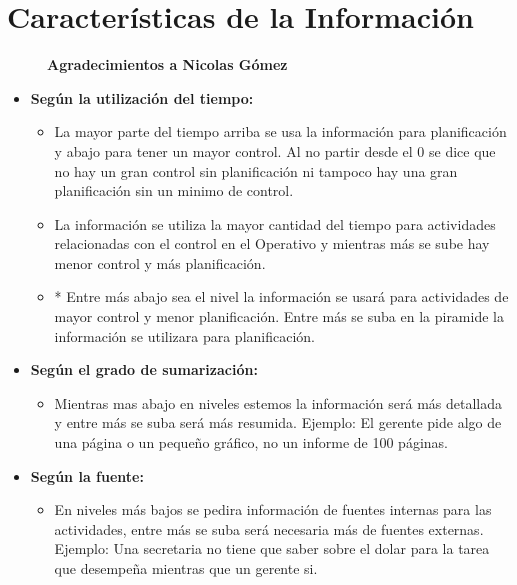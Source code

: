 \documentclass{templateNote}
\begin{document}
\section{Características de la Información}
\begin{figure}[H]
    \begin{center}
        \noindent{}
        \textbf{Agradecimientos a Nicolas Gómez}
    \end{center}
\end{figure}
\begin{itemize}
    \item \textbf{Según la utilización del tiempo:}
    \begin{itemize}
        \item La mayor parte del tiempo arriba se usa la información para planificación y abajo para tener un mayor control. Al no partir desde el 0 se dice que no hay un gran control sin planificación ni tampoco hay una gran planificación sin un minimo de control.
        \item La información se utiliza la mayor cantidad del tiempo para actividades relacionadas con el control en el Operativo y mientras más se sube hay menor control y más planificación.
        \item * Entre más abajo sea el nivel la información se usará para actividades de mayor control y menor planificación. Entre más se suba en la piramide la información se utilizara para planificación.
    \end{itemize}

    \item \textbf{Según el grado de sumarización:}
    \begin{itemize}
        \item Mientras mas abajo en niveles estemos la información será más detallada y entre más se suba será más resumida. Ejemplo: El gerente pide algo de una página o un pequeño gráfico, no un informe de 100 páginas.
    \end{itemize}

    \item \textbf{Según la fuente:}
    \begin{itemize}
        \item En niveles más bajos se pedira información de fuentes internas para las actividades, entre más se suba será necesaria más de fuentes externas. Ejemplo: Una secretaria no tiene que saber sobre el dolar para la tarea que desempeña mientras que un gerente si.
    \end{itemize}
\end{itemize}
\end{document}
